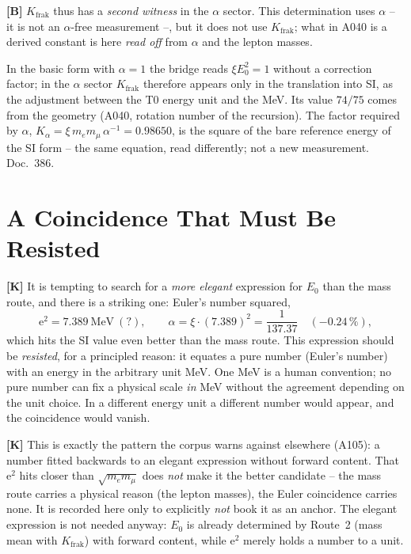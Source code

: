 \textbf{[B]} $K_\text{frak}$ thus has a \emph{second witness} in the $\alpha$
sector. This determination uses $\alpha$ -- it is not an $\alpha$-free
measurement --, but it does not use $K_\text{frak}$; what in A040 is a derived
constant is here \emph{read off} from $\alpha$ and the lepton masses.

In the basic form with $\alpha = 1$ the bridge reads $\xi E_0^2 = 1$ without a correction factor; in the $\alpha$ sector $K_{\text{frak}}$ therefore appears only in the translation into SI, as the adjustment between the T0 energy unit and the MeV. Its value $74/75$ comes from the geometry (A040, rotation number of the recursion). The factor required by $\alpha$, $K_\alpha = \xi\,m_e m_\mu\,\alpha^{-1} = 0{.}98650$, is the square of the bare reference energy of the SI form -- the same equation, read differently; not a new measurement. Doc.~386.

\section{A Coincidence That Must Be Resisted}

\textbf{[K]} It is tempting to search for a \emph{more elegant} expression for $E_0$
than the mass route, and there is a striking one: Euler's number squared,
\[
  \mathrm{e}^2 = 7{.}389\ \text{MeV}\ (?),\qquad
  \alpha = \xi\cdot(7{.}389)^2 = \frac{1}{137{.}37}\quad(-0{.}24\,\%),
\]
which hits the SI value even better than the mass route. This expression should be
\emph{resisted}, for a principled reason: it equates a pure number (Euler's number)
with an energy in the arbitrary unit MeV. One MeV is a human convention; no pure
number can fix a physical scale \emph{in} MeV without the agreement depending on
the unit choice. In a different energy unit a different number would appear, and
the coincidence would vanish.

\textbf{[K]} This is exactly the pattern the corpus warns against elsewhere
(A105): a number fitted backwards to an elegant expression without forward content.
That $\mathrm{e}^2$ hits closer than $\sqrt{m_e m_\mu}$ does \emph{not} make it
the better candidate -- the mass route carries a physical reason (the lepton masses),
the Euler coincidence carries none. It is recorded here only to explicitly
\emph{not} book it as an anchor. The elegant expression is not needed anyway:
$E_0$ is already determined by Route~2 (mass mean with $K_\text{frak}$) with forward
content, while $\mathrm{e}^2$ merely holds a number to a unit.

